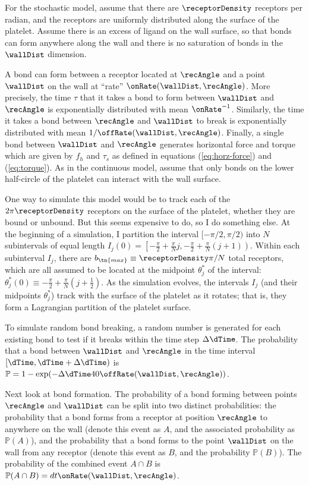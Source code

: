 For the stochastic model, assume that there are $\receptorDensity$ receptors per
radian, and the receptors are uniformly distributed along the surface
of the platelet. Assume there is an excess of ligand on the wall
surface, so that bonds can form anywhere along the wall and there is
no saturation of bonds in the $\wallDist$ dimension.

A bond can form between a receptor located at $\recAngle$ and a point
$\wallDist$ on the wall at ``rate'' $\onRate(\wallDist,
\recAngle)$. More precisely, the time $\tau$ that it takes a bond to
form between $\wallDist$ and $\recAngle$ is exponentially distributed
with mean $\onRate^{-1}$. Similarly, the time it takes a bond between
$\recAngle$ and $\wallDist$ to break is exponentially distributed with
mean $1/\offRate(\wallDist, \recAngle)$. Finally, a single bond
between $\wallDist$ and $\recAngle$ generates horizontal force and
torque which are given by $f_h$ and $\tau_s$ as defined in equations
(\ref{eq:horz-force}) and (\ref{eq:torque}). As in the continuous
model, assume that only bonds on the lower half-circle of the platelet
can interact with the wall surface.

One way to simulate this model would be to track each of the
$2\pi \receptorDensity$ receptors on the surface of the platelet,
whether they are bound or unbound. But this seems expensive to do, so
I do something else. At the beginning of a simulation, I partition the
interval $[-\pi/2, \pi/2)$ into $N$ subintervals of equal length
$I_j(0) = \left[-\frac{\pi}{2} + \frac{\pi}{N}j, -\frac{\pi}{2} +
  \frac{\pi}{N} (j+1)\right)$. Within each subinterval $I_j$, there
are $b_\tn{max} \equiv \receptorDensity \pi/N$ total receptors, which
are all assumed to be located at the midpoint $\theta_j^*$ of the interval:
$\theta_j^*(0) \equiv -\frac{\pi}{2} + \frac{\pi}{N} \left( j +
  \frac{1}{2} \right)$. As the simulation evolves, the intervals $I_j$
(and their midpoints $\theta_j^*$) track with the surface of the
platelet as it rotates; that is, they form a Lagrangian partition of
the platelet surface.

To simulate random bond breaking, a random number is generated for
each existing bond to test if it breaks within the time step $\Delta
\dTime$. The probability that a bond between $\wallDist$ and $\recAngle$ in the time
interval $[\dTime, \dTime + \Delta \dTime)$ is $\mathbb{P} = 1 - \exp(-\Delta \dTime
40\offRate(\wallDist, \recAngle))$.

Next look at bond formation. The probability of a bond forming between
points $\recAngle$ and $\wallDist$ can be split into two distinct probabilities:
the probability that a bond forms from a receptor at position $\recAngle$
to anywhere on the wall (denote this event as $A$, and the associated
probability as $\mathbb{P}(A)$), and the probability that a bond forms
to the point $\wallDist$ on the wall from any receptor (denote this event as
$B$, and the probability $\mathbb{P}(B)$). The probability of the
combined event $A \cap B$ is $\mathbb{P}(A \cap B) = dt
\onRate(\wallDist, \recAngle)$. 

